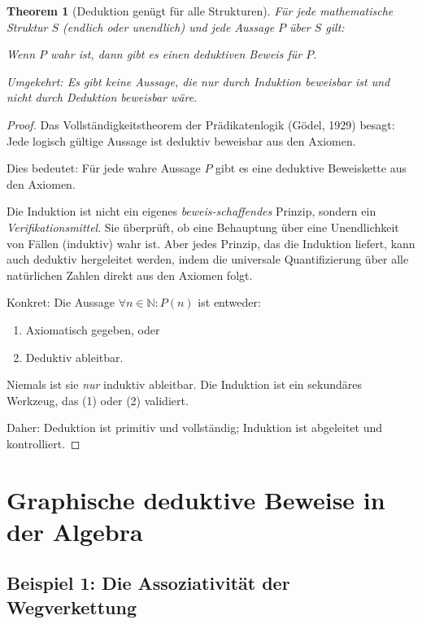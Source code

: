 \documentclass[12pt, a4paper]{article}
\newtheorem{theorem}{Theorem}[section]
\theoremstyle{definition}
\theoremstyle{remark}
\newcommand{\N}{\mathbb{N}}
\begin{document}
\begin{theorem}[Deduktion genügt für alle Strukturen]
\label{thm:deduktion_genuegtfueralle}
Für jede mathematische Struktur $S$ (endlich oder unendlich) und jede Aussage $P$ über $S$ gilt:

Wenn $P$ wahr ist, dann gibt es einen deduktiven Beweis für $P$.

Umgekehrt: Es gibt keine Aussage, die nur durch Induktion beweisbar ist und nicht durch Deduktion beweisbar wäre.
\end{theorem}

\begin{proof}
Das Vollständigkeitstheorem der Prädikatenlogik (Gödel, 1929) besagt: Jede logisch gültige Aussage ist deduktiv beweisbar aus den Axiomen.

Dies bedeutet: Für jede wahre Aussage $P$ gibt es eine deduktive Beweiskette aus den Axiomen.

Die Induktion ist nicht ein eigenes \emph{beweis-schaffendes} Prinzip, sondern ein \emph{Verifikationsmittel}. Sie überprüft, ob eine Behauptung über eine Unendlichkeit von Fällen (induktiv) wahr ist. Aber jedes Prinzip, das die Induktion liefert, kann auch deduktiv hergeleitet werden, indem die universale Quantifizierung über alle natürlichen Zahlen direkt aus den Axiomen folgt.

Konkret: Die Aussage $\forall n \in \N: P(n)$ ist entweder:
\begin{enumerate}[label=(\alph*)]
  \item Axiomatisch gegeben, oder
  \item Deduktiv ableitbar.
\end{enumerate}

Niemals ist sie \emph{nur} induktiv ableitbar. Die Induktion ist ein sekundäres Werkzeug, das (1) oder (2) validiert.

Daher: Deduktion ist primitiv und vollständig; Induktion ist abgeleitet und kontrolliert.
\end{proof}

\section{Graphische deduktive Beweise in der Algebra}
\label{sec:graphische_beweise}

\subsection{Beispiel 1: Die Assoziativität der Wegverkettung}
\label{subsec:beispiel_assoziativitaet}
\end{document}
